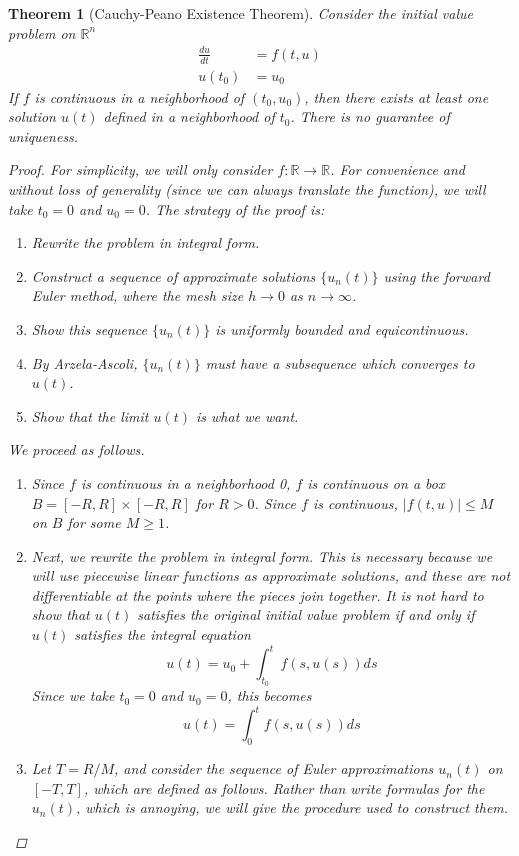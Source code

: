 \documentclass[12pt]{amsart}         %
\newtheorem{theorem}{Theorem}[section]
\theoremstyle{remark}
\newcommand{\R}{\mathbb{R}}
\begin{document}
\begin{theorem}[Cauchy-Peano Existence Theorem]
Consider the initial value problem on $\R^n$
\begin{align*}
\frac{du}{dt} &= f(t, u) \\
u(t_0) &= u_0
\end{align*}
If $f$ is continuous in a neighborhood of $(t_0, u_0)$, then there exists at least one solution $u(t)$ defined in a neighborhood of $t_0$. There is no guarantee of uniqueness.
\begin{proof}
For simplicity, we will only consider $f: \R \rightarrow \R$. For convenience and without loss of generality (since we can always translate the function), we will take $t_0 = 0$ and $u_0 = 0$. The strategy of the proof is:
\begin{enumerate}
    \item Rewrite the problem in integral form.
	\item Construct a sequence of approximate solutions $\{ u_n(t) \}$ using the forward Euler method, where the mesh size $h \rightarrow 0$ as $n \rightarrow \infty$.
	\item Show this sequence $\{ u_n(t) \}$ is uniformly bounded and equicontinuous.
	\item By Arzela-Ascoli, $\{ u_n(t) \}$ must have a subsequence which converges to $u(t)$.
	\item Show that the limit $u(t)$ is what we want.
\end{enumerate}
We proceed as follows.
\begin{enumerate}
    \item Since $f$ is continuous in a neighborhood 0, $f$ is continuous on a box $B = [-R, R] \times [-R, R]$ for $R > 0$. Since $f$ is continuous, $|f(t, u)| \leq M$ on $B$ for some $M \geq 1$.
    \item Next, we rewrite the problem in integral form. This is necessary because we will use piecewise linear functions as approximate solutions, and these are not differentiable at the points where the pieces join together. It is not hard to show that $u(t)$ satisfies the original initial value problem if and only if $u(t)$ satisfies the integral equation
    \[
    u(t) = u_0 + \int_{t_0}^t f(s, u(s))ds
    \]
    Since we take $t_0 = 0$ and $u_0 = 0$, this becomes
    \[
    u(t) = \int_0^t f(s, u(s))ds
    \]
    \item Let $T = R/M$, and consider the sequence of Euler approximations $u_n(t)$ on $[-T, T]$, which are defined as follows. Rather than write formulas for the $u_n(t)$, which is annoying, we will give the procedure used to construct them.

\end{enumerate}
\end{proof}
\end{theorem}
\end{document}
